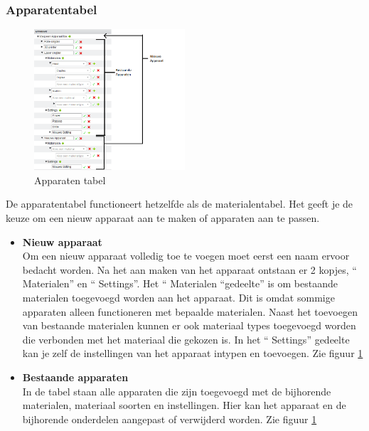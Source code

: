 \subsubsection{Apparatentabel }
\begin{figure}[Hh]
	\centering
	\includegraphics[width=0.5\textwidth]{Images/apparaattable2.png}
	\caption{Apparaten tabel }
	\label{fig:apparatentabel}
\end{figure}

De apparatentabel functioneert hetzelfde als de materialentabel. Het geeft je de keuze om een nieuw apparaat aan te maken of apparaten aan te passen.

\begin {itemize}
\item \textbf{Nieuw apparaat}\\
Om een nieuw apparaat volledig toe te voegen moet eerst een naam ervoor bedacht worden. Na het aan maken van het apparaat ontstaan er 2 kopjes, `` Materialen'' en `` Settings''. Het “ Materialen ``gedeelte'' is om bestaande materialen toegevoegd worden aan het apparaat. Dit is omdat sommige apparaten alleen functioneren met bepaalde materialen. Naast het toevoegen van bestaande materialen kunnen er ook materiaal types toegevoegd worden die verbonden met het materiaal die gekozen is. In het `` Settings'' gedeelte kan je zelf de instellingen van het apparaat intypen en toevoegen. Zie figuur \ref{fig:apparatentabel}

\item \textbf{Bestaande apparaten}\\
In de tabel staan alle apparaten die zijn toegevoegd met de bijhorende materialen, materiaal soorten en instellingen. Hier kan het apparaat en de bijhorende onderdelen aangepast of verwijderd worden. Zie figuur \ref{fig:apparatentabel}
\end {itemize}